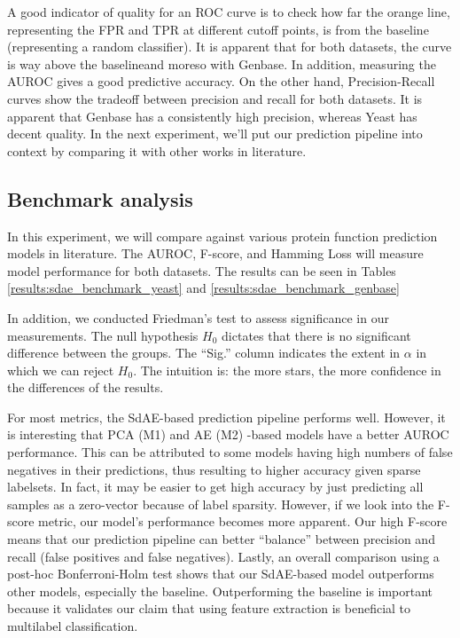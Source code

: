 \par A good indicator of quality for an ROC curve is to check how far the
orange line, representing the FPR and TPR at different cutoff points, is from
the baseline (representing a random classifier). It is apparent that for both
datasets, the curve is way above the baseline\textemdash and moreso with
Genbase. In addition, measuring the AUROC gives a good predictive accuracy.
On the other hand, Precision-Recall curves show the tradeoff between
precision and recall for both datasets. It is apparent that Genbase has a
consistently high precision, whereas Yeast has decent quality. In the next
experiment, we'll put our prediction pipeline into context by comparing it
with other works in literature.


\subsection{Benchmark analysis}

\par In this experiment, we will compare against various protein function
prediction models in literature. The AUROC, F-score, and Hamming Loss will
measure model performance for both datasets. The results can be seen in
Tables \ref{results:sdae_benchmark_yeast} and
\ref{results:sdae_benchmark_genbase}

\par In addition, we conducted Friedman's test to assess significance in our
measurements. The null hypothesis $H_{0}$ dictates that there is no
significant difference between the groups. The ``Sig.'' column indicates the
extent in $\alpha$ in which we can reject $H_{0}$. The intuition is: the more
stars, the more confidence in the differences of the results.

\par For most metrics, the SdAE-based prediction pipeline performs well.
However, it is interesting that PCA (M1) and AE (M2) -based models have a
better AUROC performance. This can be attributed to some models having high
numbers of false negatives in their predictions, thus resulting to higher
accuracy given sparse labelsets. In fact, it may be easier to get high
accuracy by just predicting all samples as a zero-vector because of label
sparsity. However, if we look into the F-score metric, our model's
performance becomes more apparent. Our high F-score means that our prediction
pipeline can better ``balance'' between precision and recall (false positives
and false negatives). Lastly, an overall comparison using a post-hoc
Bonferroni-Holm test shows that our SdAE-based model outperforms other
models, especially the baseline. Outperforming the baseline is important
because it validates our claim that using feature extraction is beneficial to
multilabel classification.

